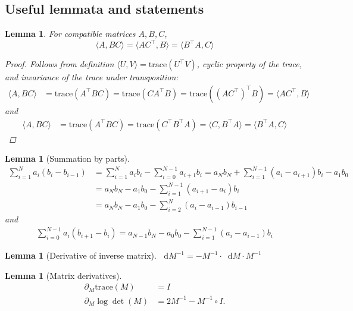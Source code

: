 \documentclass[10pt]{article}
\numberwithin{equation}{section}
\numberwithin{figure}{section}
\newtheorem{lem}[thm]{Lemma}
\theoremstyle{remark}
\newcommand{\tr}{\mathrm{trace}}
\newcommand{\dd }{\mathop{}\!\mathrm{d}}
\begin{document}
\begin{appendix}
    \section{Useful lemmata and statements}
\begin{lem}
    For compatible matrices $A,B,C$,
    \begin{equation}
        \langle A,BC\rangle = \langle AC^\top, B\rangle = \langle B^\top A, C\rangle
    \end{equation}
    \begin{proof}
        Follows from definition $\langle U, V\rangle = \tr(U^\top V)$, cyclic property of the trace, and invariance of the trace under transposition:
        \begin{align*}
            \langle A, BC\rangle &= \tr(A^\top BC) = \tr(CA^\top B) = \tr((AC^\top)^\top B) = \langle AC^\top, B\rangle
        \end{align*}
        and
        \begin{align*}
            \langle A, BC\rangle &= \tr(A^\top BC) = \tr(C^\top B^\top A) = \langle C, B^\top A\rangle = \langle B^\top A, C\rangle
        \end{align*}
    \end{proof}
\end{lem}
\begin{lem}[Summation by parts]
    \begin{align*}
        \sum_{i=1}^N a_i (b_i - b_{i-1}) &= \sum_{i=1}^N a_i b_i - \sum_{i=0}^{N-1} a_{i+1}b_i = a_Nb_N + \sum_{i=1}^{N-1}(a_i - a_{i+1})b_i- a_1b_0\\
        &= a_Nb_N-a_1b_0 - \sum_{i=1}^{N-1}(a_{i+1}-a_i)b_i\\
        &= a_Nb_N-a_1b_0 - \sum_{i=2}^{N}(a_{i}-a_{i-1})b_{i-1}
    \end{align*}
    and
    \begin{align*}
        \sum_{i=0}^{N-1} a_i(b_{i+1}-b_i) = a_{N-1}b_N - a_0b_0 - \sum_{i=1}^{N-1}(a_i-a_{i-1})b_i
    \end{align*}
\end{lem}
\begin{lem}[Derivative of inverse matrix]
    $\dd M^{-1} = -M^{-1}\cdot \dd M \cdot M^{-1}$
\end{lem}
\begin{lem}[Matrix derivatives]\label{lem:matrix_derivatives}
    \begin{align*}
        \partial_M \tr(M) &= I\\
        \partial_M \log\det(M) &= 2M^{-1} - M^{-1}\circ I.
    \end{align*}
\end{lem}


\end{appendix}
\end{document}
